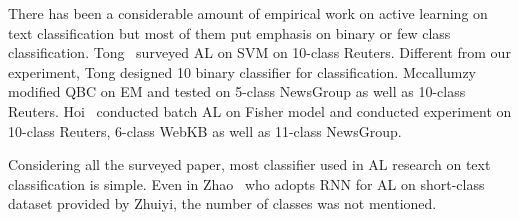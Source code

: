 There has been a considerable amount of empirical work on active learning on text classification but most of them put emphasis on binary or few class classification. Tong~ surveyed AL on SVM on 10-class Reuters. Different from our experiment, Tong designed 10 binary classifier for classification. Mccallumzy~ modified QBC on EM and tested on 5-class NewsGroup as well as 10-class Reuters. Hoi~ conducted batch AL on Fisher model and conducted experiment on 10-class Reuters, 6-class WebKB as well as 11-class NewsGroup.

Considering all the surveyed paper, most classifier used in AL research on text classification is simple. 
Even in Zhao~ who adopts RNN for AL on short-class dataset provided by Zhuiyi, the number of classes was not mentioned. 
